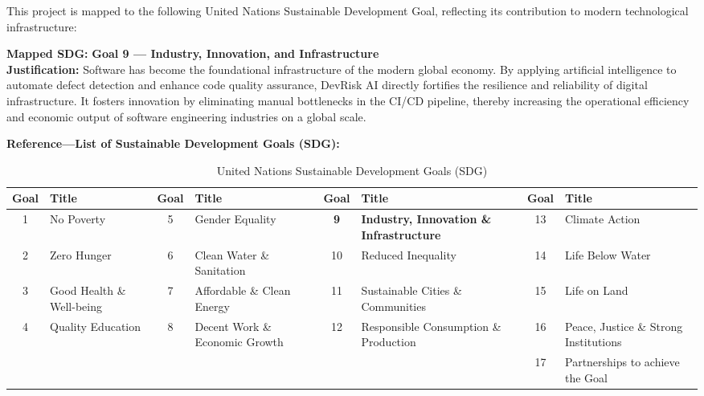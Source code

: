 \documentclass[12pt, a4paper]{article}
\begin{document}
This project is mapped to the following United Nations Sustainable Development Goal, reflecting its contribution to modern technological infrastructure:

\vspace{0.3cm}
\noindent \textbf{Mapped SDG:} \textbf{Goal 9 --- Industry, Innovation, and Infrastructure}\\[0.2cm]
\textbf{Justification:} Software has become the foundational infrastructure of the modern global economy. By applying artificial intelligence to automate defect detection and enhance code quality assurance, DevRisk AI directly fortifies the resilience and reliability of digital infrastructure. It fosters innovation by eliminating manual bottlenecks in the CI/CD pipeline, thereby increasing the operational efficiency and economic output of software engineering industries on a global scale.

\vspace{0.5cm}
\noindent \textbf{Reference---List of Sustainable Development Goals (SDG):}

\vspace{0.2cm}
\begin{table}[h!]
\centering
\caption{United Nations Sustainable Development Goals (SDG)}
\vspace{0.2cm}
\footnotesize
\begin{tabularx}{\textwidth}{|c|X|c|X|c|X|c|X|}
\hline
\textbf{Goal} & \textbf{Title} & \textbf{Goal} & \textbf{Title} & \textbf{Goal} & \textbf{Title} & \textbf{Goal} & \textbf{Title} \\ \hline
1 & No Poverty & 5 & Gender Equality & \textbf{9} & \textbf{Industry, Innovation \& Infrastructure} & 13 & Climate Action \\ \hline
2 & Zero Hunger & 6 & Clean Water \& Sanitation & 10 & Reduced Inequality & 14 & Life Below Water \\ \hline
3 & Good Health \& Well-being & 7 & Affordable \& Clean Energy & 11 & Sustainable Cities \& Communities & 15 & Life on Land \\ \hline
4 & Quality Education & 8 & Decent Work \& Economic Growth & 12 & Responsible Consumption \& Production & 16 & Peace, Justice \& Strong Institutions \\ \hline
\multicolumn{6}{|c|}{} & 17 & Partnerships to achieve the Goal \\ \hline
\end{tabularx}
\end{table}

\clearpage
\end{document}
